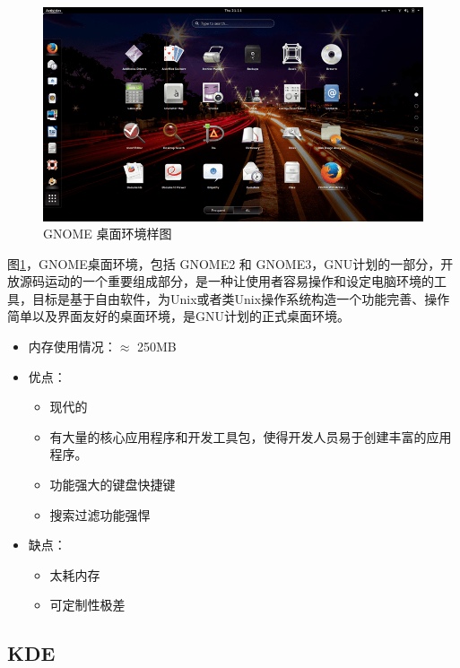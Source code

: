 \documentclass[doctor,openright,twoside]{sjtuthesis}
\providecommand{\tightlist}{%
    \setlength{\itemsep}{0pt}\setlength{\parskip}{0pt}}
\theoremstyle{plain}
\theoremstyle{definition}
\theoremstyle{remark}
\theoremstyle{ocrenumbox}
\theoremstyle{plain}
\begin{document}
\begin{figure}
\includegraphics{de-GNOME} \caption[GNOME 桌面环境样图]{GNOME 桌面环境样图}\label{fig:de-GNOME}
\end{figure}

图\ref{fig:de-GNOME}，GNOME桌面环境，包括 GNOME2 和 GNOME3，GNU计划的一部分，开放源码运动的一个重要组成部分，是一种让使用者容易操作和设定电脑环境的工具，目标是基于自由软件，为Unix或者类Unix操作系统构造一个功能完善、操作简单以及界面友好的桌面环境，是GNU计划的正式桌面环境。

\begin{itemize}
\tightlist
\item
  内存使用情况：\(\approx\) 250MB
\item
  优点：

  \begin{itemize}
  \tightlist
  \item
    现代的
  \item
    有大量的核心应用程序和开发工具包，使得开发人员易于创建丰富的应用程序。
  \item
    功能强大的键盘快捷键
  \item
    搜索过滤功能强悍
  \end{itemize}
\item
  缺点：

  \begin{itemize}
  \tightlist
  \item
    太耗内存
  \item
    可定制性极差
  \end{itemize}
\end{itemize}

\hypertarget{kde}{%
\subsection{KDE}\label{kde}}
\end{document}
